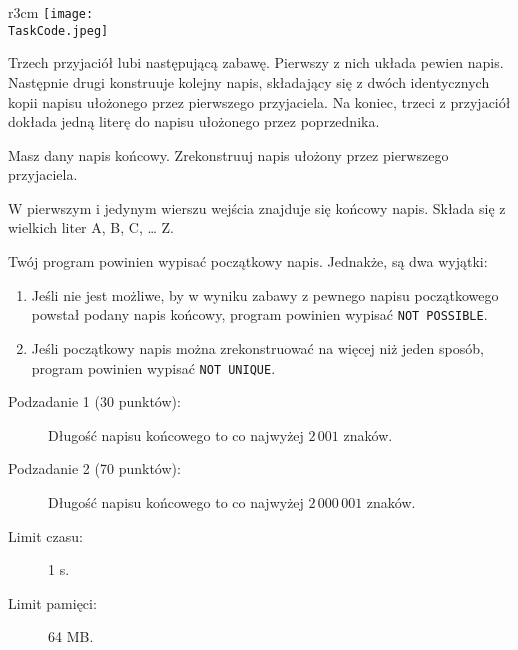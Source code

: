 \documentclass{boi2014-pl}
\renewcommand{\TaskCode}{friends}
\begin{document}
    \begin{wrapfigure}{r}{3cm}
		\texttt{[image: \\TaskCode.jpeg]}
	\end{wrapfigure}
    Trzech przyjaciół lubi następującą zabawę.
    Pierwszy z nich układa pewien napis.
    Następnie drugi konstruuje kolejny napis, składający się z dwóch identycznych kopii napisu ułożonego przez pierwszego przyjaciela.
    Na koniec, trzeci z przyjaciół dokłada jedną literę do napisu ułożonego przez poprzednika.

    \Task
    Masz dany napis końcowy. Zrekonstruuj napis ułożony przez pierwszego przyjaciela.

    \Input
    W pierwszym i jedynym wierszu wejścia znajduje się końcowy napis. Składa się z wielkich liter A, B, C, \ldots{} Z.

    \Output
    Twój program powinien wypisać początkowy napis.
    Jednakże, są dwa wyjątki:
    \begin{enumerate}
        \item Jeśli nie jest możliwe, by w wyniku zabawy z pewnego napisu początkowego powstał podany napis końcowy, program powinien wypisać {\tt NOT POSSIBLE}.
        \item Jeśli początkowy napis można zrekonstruować na więcej niż jeden sposób, program powinien wypisać {\tt NOT
        UNIQUE}.
    \end{enumerate}
    

    \Examples


    \Scoring

    \begin{description}
        \item[Podzadanie 1 (30 punktów):] Długość napisu końcowego to co najwyżej $2\,001$ znaków.
        \item[Podzadanie 2 (70 punktów):] Długość napisu końcowego to co najwyżej $2\,000\,001$ znaków.
    \end{description}

    \Constraints

    \begin{description}
        \item[Limit czasu:] 1 s.
        \item[Limit pamięci:] 64 MB.
    \end{description}
\end{document}
